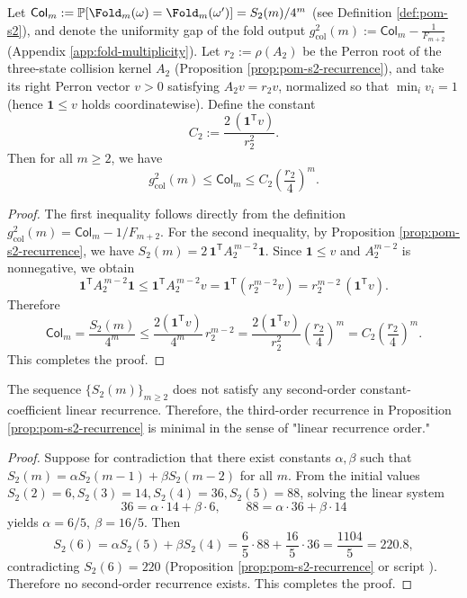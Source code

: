 \begin{corollary}\label{cor:fold-col-gap-exp-upper}
Let \(\mathsf{Col}_m:=\mathbb{P}[\Fold_m(\omega)=\Fold_m(\omega')]=S_2(m)/4^m\) (see Definition \ref{def:pom-s2}), and denote the uniformity gap of the fold output
\(
g_{\mathrm{col}}^2(m):=\mathsf{Col}_m-\frac{1}{F_{m+2}}
\)
(Appendix \ref{app:fold-multiplicity}).
Let \(r_2:=\rho(A_2)\) be the Perron root of the three-state collision kernel \(A_2\) (Proposition \ref{prop:pom-s2-recurrence}), and take its right Perron vector \(v>0\) satisfying \(A_2v=r_2v\), normalized so that \(\min_i v_i=1\) (hence \(\mathbf{1}\le v\) holds coordinatewise).
Define the constant
\[
C_2:=\frac{2\,(\mathbf{1}^{\mathsf T}v)}{r_2^2}.
\]
Then for all \(m\ge 2\), we have
\[
g_{\mathrm{col}}^2(m)\le \mathsf{Col}_m\le C_2\left(\frac{r_2}{4}\right)^m.
\]
\end{corollary}

\begin{proof}
The first inequality follows directly from the definition \(g_{\mathrm{col}}^2(m)=\mathsf{Col}_m-1/F_{m+2}\).
For the second inequality, by Proposition \ref{prop:pom-s2-recurrence}, we have
\(
S_2(m)=2\,\mathbf{1}^{\mathsf T}A_2^{\,m-2}\mathbf{1}
\).
Since \(\mathbf{1}\le v\) and \(A_2^{m-2}\) is nonnegative, we obtain
\[
\mathbf{1}^{\mathsf T}A_2^{\,m-2}\mathbf{1}\le \mathbf{1}^{\mathsf T}A_2^{\,m-2}v=\mathbf{1}^{\mathsf T}(r_2^{m-2}v)=r_2^{m-2}\,(\mathbf{1}^{\mathsf T}v).
\]
Therefore
\[
\mathsf{Col}_m=\frac{S_2(m)}{4^m}\le \frac{2(\mathbf{1}^{\mathsf T}v)}{4^m}\,r_2^{m-2}
=\frac{2(\mathbf{1}^{\mathsf T}v)}{r_2^2}\left(\frac{r_2}{4}\right)^m
=C_2\left(\frac{r_2}{4}\right)^m.
\]
This completes the proof.
\end{proof}

\begin{lemma}\label{lem:pom-s2-minimal-order}
The sequence \(\{S_2(m)\}_{m\ge 2}\) does not satisfy any second-order constant-coefficient linear recurrence. Therefore, the third-order recurrence in Proposition \ref{prop:pom-s2-recurrence} is minimal in the sense of "linear recurrence order."
\end{lemma}
\begin{proof}
Suppose for contradiction that there exist constants \(\alpha,\beta\) such that \(S_2(m)=\alpha S_2(m-1)+\beta S_2(m-2)\) for all \(m\).
From the initial values \(S_2(2)=6,S_2(3)=14,S_2(4)=36,S_2(5)=88\), solving the linear system
$$
36=\alpha\cdot 14+\beta\cdot 6,\qquad
88=\alpha\cdot 36+\beta\cdot 14
$$
yields \(\alpha=6/5,\ \beta=16/5\). Then
$$
S_2(6)=\alpha S_2(5)+\beta S_2(4)=\frac65\cdot 88+\frac{16}{5}\cdot 36=\frac{1104}{5}=220.8,
$$
contradicting \(S_2(6)=220\) (Proposition \ref{prop:pom-s2-recurrence} or script ). Therefore no second-order recurrence exists. This completes the proof.
\end{proof}

